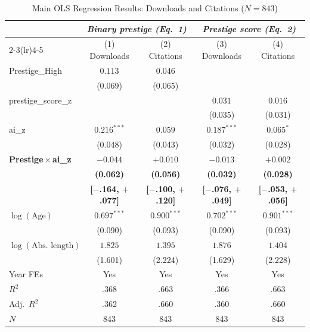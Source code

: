 \documentclass[12pt,a4paper]{article}
\begin{document}
\newpage

\begin{table}[htbp]
\centering
\caption{Main OLS Regression Results: Downloads and Citations ($N = 843$)}
\label{tab:main}
\begin{threeparttable}
\small
\begin{tabular}{lcccc}
\toprule
 & \multicolumn{2}{c}{\textit{Binary prestige (Eq.~1)}}
 & \multicolumn{2}{c}{\textit{Prestige score (Eq.~2)}} \\
\cmidrule(lr){2-3}\cmidrule(lr){4-5}
 & (1) Downloads & (2) Citations & (3) Downloads & (4) Citations \\
\midrule
Prestige\_High
  & $0.113$       & $0.046$       &               &              \\
  & (0.069)       & (0.065)       &               &              \\[4pt]
prestige\_score\_z
  &               &               & $0.031$       & $0.016$      \\
  &               &               & (0.035)       & (0.031)      \\[4pt]
ai\_z
  & $0.216^{***}$ & $0.059$       & $0.187^{***}$ & $0.065^{*}$  \\
  & (0.048)       & (0.043)       & (0.032)       & (0.028)      \\[4pt]
\textbf{Prestige\,$\times$\,ai\_z}
  & $\mathbf{-0.044}$ & $\mathbf{+0.010}$ & $\mathbf{-0.013}$ & $\mathbf{+0.002}$ \\
  & \textbf{(0.062)}  & \textbf{(0.056)}  & \textbf{(0.032)}  & \textbf{(0.028)}  \\
  & \textbf{[$-$.164, $+$.077]} & \textbf{[$-$.100, $+$.120]}
  & \textbf{[$-$.076, $+$.049]} & \textbf{[$-$.053, $+$.056]} \\[4pt]
$\log(\text{Age})$
  & $0.697^{***}$ & $0.900^{***}$ & $0.702^{***}$ & $0.901^{***}$ \\
  & (0.090)       & (0.093)       & (0.090)       & (0.093)       \\[4pt]
$\log(\text{Abs.\ length})$
  & $1.825$       & $1.395$       & $1.876$       & $1.404$       \\
  & (1.601)       & (2.224)       & (1.629)       & (2.228)       \\[4pt]
\midrule
Year FEs           & Yes  & Yes  & Yes  & Yes  \\
$R^2$              & .368 & .663 & .366 & .663 \\
Adj.\ $R^2$        & .362 & .660 & .360 & .660 \\
$N$                & 843  & 843  & 843  & 843  \\

\end{tabular}
\end{threeparttable}
\end{table}
\end{document}
